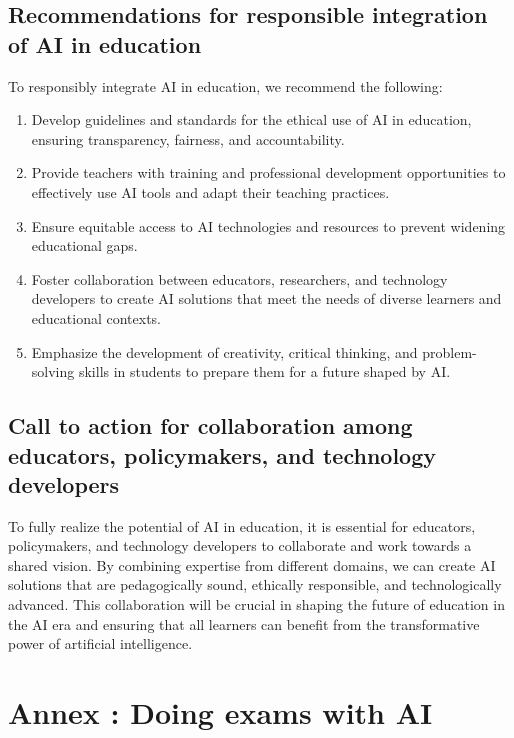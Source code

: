 \documentclass{article}
\begin{document}
\subsection{Recommendations for responsible integration of AI in education}
To responsibly integrate AI in education, we recommend the following:

\begin{enumerate}
    \item Develop guidelines and standards for the ethical use of AI in education, ensuring transparency, fairness, and accountability.
    \item Provide teachers with training and professional development opportunities to effectively use AI tools and adapt their teaching practices.
    \item Ensure equitable access to AI technologies and resources to prevent widening educational gaps.
    \item Foster collaboration between educators, researchers, and technology developers to create AI solutions that meet the needs of diverse learners and educational contexts.
    \item Emphasize the development of creativity, critical thinking, and problem-solving skills in students to prepare them for a future shaped by AI.
\end{enumerate}

\subsection{Call to action for collaboration among educators, policymakers, and technology developers}
To fully realize the potential of AI in education, it is essential for educators, policymakers, and technology developers to collaborate and work towards a shared vision. By combining expertise from different domains, we can create AI solutions that are pedagogically sound, ethically responsible, and technologically advanced. This collaboration will be crucial in shaping the future of education in the AI era and ensuring that all learners can benefit from the transformative power of artificial intelligence.

\newpage
\section*{Annex : Doing exams with AI}

\cite{einstein}




\end{document}
